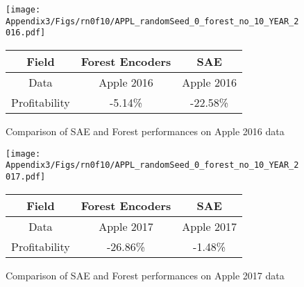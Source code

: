 \begin{figure}[!htb]
    \centering
    \texttt{[image: Appendix3/Figs/rn0f10/APPL\_randomSeed\_0\_forest\_no\_10\_YEAR\_2016.pdf]}
    \qquad
    \begin{tabular}[b]{|c|c|c|}\hline
      Field & Forest Encoders & SAE \\ \hline
      Data & Apple 2016 & Apple 2016 \\ \hline
      Profitability & -5.14\% & -22.58\% \\ \hline
    \end{tabular}
    \captionsetup{labelformat=andtable}
    \caption{Comparison of SAE and Forest performances on Apple 2016 data}
\end{figure}
\newpage

\begin{figure}[!htb]
    \centering
    \texttt{[image: Appendix3/Figs/rn0f10/APPL\_randomSeed\_0\_forest\_no\_10\_YEAR\_2017.pdf]}
    \qquad
    \begin{tabular}[b]{|c|c|c|}\hline
      Field & Forest Encoders & SAE \\ \hline
      Data & Apple 2017 & Apple 2017 \\ \hline
      Profitability & -26.86\% & -1.48\% \\ \hline
    \end{tabular}
    \captionsetup{labelformat=andtable}
    \caption{Comparison of SAE and Forest performances on Apple 2017 data}
\end{figure}
\newpage


